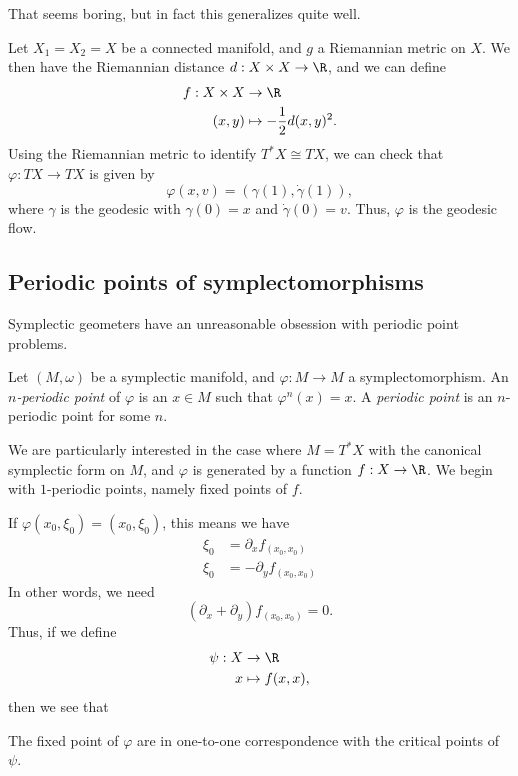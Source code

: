 \documentclass[a4paper]{article}
\begin{document}
That seems boring, but in fact this generalizes quite well.
\begin{eg}
  Let $X_1 = X_2 = X$ be a connected manifold, and $g$ a Riemannian metric on $X$. We then have the Riemannian distance $d: X \times X \to \R$, and we can define
  \begin{align*}
    f: X \times X &\to \R\\
    (x, y) &\mapsto - \frac{1}{2} d(x, y)^2.
  \end{align*}
  Using the Riemannian metric to identify $T^*X \cong TX$, we can check that $\varphi: TX \to TX$ is given by
  \[
    \varphi(x, v) = (\gamma(1), \dot{\gamma}(1)),
  \]
  where $\gamma$ is the geodesic with $\gamma(0) = x$ and $\dot{\gamma}(0) = v$. Thus, $\varphi$ is the geodesic flow.
\end{eg}

\subsection{Periodic points of symplectomorphisms}
Symplectic geometers have an unreasonable obsession with periodic point problems.

\begin{defi}
  Let $(M, \omega)$ be a symplectic manifold, and $\varphi: M \to M$ a symplectomorphism. An \emph{$n$-periodic point} of $\varphi$ is an $x \in M$ such that $\varphi^n(x) = x$. A \emph{periodic point} is an $n$-periodic point for some $n$.
\end{defi}

We are particularly interested in the case where $M = T^*X$ with the canonical symplectic form on $M$, and $\varphi$ is generated by a function $f: X \to \R$. We begin with $1$-periodic points, namely fixed points of $f$.

If $\varphi(x_0, \xi_0) = (x_0, \xi_0)$, this means we have
\begin{align*}
  \xi_0 &= \partial_x f_{(x_0, x_0)}\\
  \xi_0 &= -\partial_y f_{(x_0, x_0)}
\end{align*}
In other words, we need
\[
  (\partial_x + \partial_y) f_{(x_0, x_0)} = 0.
\]
Thus, if we define
\begin{align*}
  \psi: X &\to \R\\
  x &\mapsto f(x, x),
\end{align*}
then we see that 
\begin{prop}
  The fixed point of $\varphi$ are in one-to-one correspondence with the critical points of $\psi$.
\end{prop}
\end{document}
